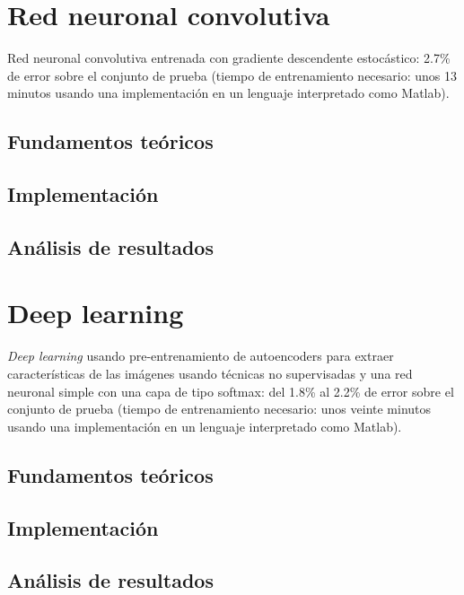 \section{Red neuronal convolutiva}

Red neuronal convolutiva entrenada con gradiente descendente estocástico: 2.7\%
de error sobre el conjunto de prueba (tiempo de entrenamiento necesario: unos 13
minutos usando una implementación en un lenguaje interpretado como Matlab).

\subsection{Fundamentos teóricos}

\subsection{Implementación}

\subsection{Análisis de resultados}


\section{Deep learning}

\textit{Deep learning} usando pre-entrenamiento de autoencoders para extraer características de las imágenes usando técnicas no supervisadas y una red neuronal simple con una capa de tipo softmax: del 1.8\% al 2.2\% de error sobre el conjunto de prueba (tiempo de entrenamiento necesario: unos veinte minutos usando una implementación en un lenguaje interpretado como Matlab).

\subsection{Fundamentos teóricos}

\subsection{Implementación}

\subsection{Análisis de resultados}





